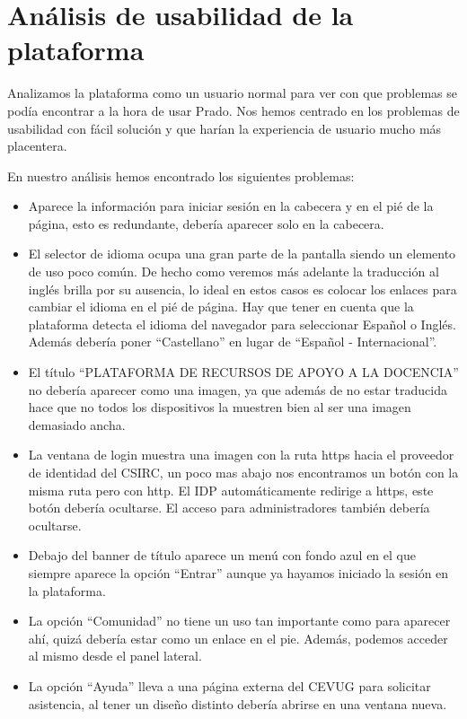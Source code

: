 \section{Análisis de usabilidad de la plataforma}

Analizamos la plataforma como un usuario normal para ver con que problemas se podía encontrar a la hora de usar Prado. Nos hemos centrado en los problemas de usabilidad con fácil solución y que harían la experiencia de usuario mucho más placentera.

\bigskip
En nuestro análisis hemos encontrado los siguientes problemas:

\begin{itemize}

\item Aparece la información para iniciar sesión en la cabecera y en el pié de la página, esto es redundante, debería aparecer solo en la cabecera.
\item El selector de idioma ocupa una gran parte de la pantalla siendo un elemento de uso poco común. De hecho como veremos más adelante la traducción al inglés brilla por su ausencia, lo ideal en estos casos es colocar los enlaces para cambiar el idioma en el pié de página. Hay que tener en cuenta que la plataforma detecta el idioma del navegador para seleccionar Español o Inglés. Además debería poner ``Castellano'' en lugar de ``Español - Internacional''.
\item El título ``PLATAFORMA DE RECURSOS DE APOYO A LA DOCENCIA'' no debería aparecer como una imagen, ya que además de no estar traducida hace que no todos los dispositivos la muestren bien al ser una imagen demasiado ancha.
\item La ventana de login muestra una imagen con la ruta https hacia el proveedor de identidad del CSIRC, un poco mas abajo nos encontramos un botón con la misma ruta pero con http. El IDP automáticamente redirige a https, este botón debería ocultarse. El acceso para administradores también debería ocultarse.
\item Debajo del banner de título aparece un menú con fondo azul en el que siempre aparece la opción ``Entrar'' aunque ya hayamos iniciado la sesión en la plataforma.
\item La opción ``Comunidad'' no tiene un uso tan importante como para aparecer ahí, quizá debería estar como un enlace en el pie. Además, podemos acceder al mismo desde el panel lateral.
\item La opción ``Ayuda'' lleva a una página externa del CEVUG para solicitar asistencia, al tener un diseño distinto debería abrirse en una ventana nueva.

\end{itemize}
